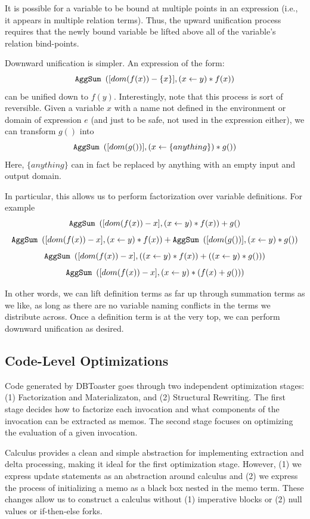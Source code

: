 \documentclass[11pt]{amsart}
\newcommand{\AggSum}{{\tt AggSum}\ }
\begin{document}
It is possible for a variable to be bound at multiple points in an expression (i.e., it appears in multiple relation terms).  Thus, the upward unification process requires that the newly bound variable be lifted above all of the variable's relation bind-points.

Downward unification is simpler.  An expression of the form:
$$\AggSum\left([dom(f(x)) - \{x\}], (x \gets y) * f(x)\right)$$
can be unified down to $f(y)$.  Interestingly, note that this process is sort of reversible.  Given a variable $x$ with a name not defined in the environment or domain of expression $e$ (and just to be safe, not used in the expression either), we can transform $g()$ into
$$\AggSum\left([dom(g())], (x \gets \{anything\}) * g()\right)$$
Here, $\{anything\}$ can in fact be replaced by anything with an empty input and output domain.

In particular, this allows us to perform factorization over variable definitions.  For example
$$\AggSum\left([dom(f(x)) - x], (x \gets y) * f(x)\right) + g()$$
$$\AggSum\left([dom(f(x)) - x], (x \gets y) * f(x)\right) + \AggSum\left([dom(g())], (x \gets y) * g()\right)$$
$$\AggSum\left([dom(f(x)) - x], ((x \gets y) * f(x)) + ((x \gets y) * g()) \right)$$
$$\AggSum\left([dom(f(x)) - x], (x \gets y) * (f(x) + g()) \right)$$

In other words, we can lift definition terms as far up through summation terms as we like, as long as there are no variable naming conflicts in the terms we distribute across.  Once a definition term is at the very top, we can perform downward unification as desired.

\subsection{Code-Level Optimizations}
Code generated by DBToaster goes through two independent optimization stages: (1) Factorization and Materializaton, and (2) Structural Rewriting.  The first stage decides how to factorize each invocation and what components of the invocation can be extracted as memos.  The second stage focuses on optimizing the evaluation of a given invocation.

Calculus provides a clean and simple abstraction for implementing extraction and  delta processing, making it ideal for the first optimization stage.  However, (1) we express update statements as an abstraction around calculus and (2) we express the process of initializing a memo as a black box nested in the memo term.  These changes allow us to construct a calculus without (1) imperative blocks or (2) null values or if-then-else forks.
\end{document}
